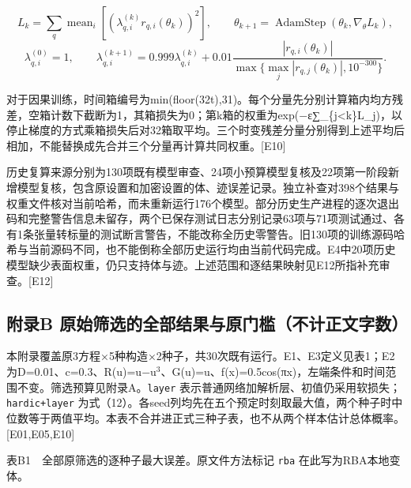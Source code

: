\documentclass[11pt,a4paper]{article}
\begin{document}
\[
L_k=\sum_q\operatorname{mean}_i[(\lambda_{q,i}^{(k)}r_{q,i}(\theta_k))^2],\qquad
\theta_{k+1}=\operatorname{AdamStep}(\theta_k,\nabla_\theta L_k),
\] \[
\lambda_{q,i}^{(0)}=1,\qquad
\lambda_{q,i}^{(k+1)}=0.999\lambda_{q,i}^{(k)}
+0.01\frac{|r_{q,i}(\theta_k)|}{\max\{\max_j|r_{q,j}(\theta_k)|,10^{-300}\}}.
\]

对于因果训练，时间箱编号为min(floor(32t),31)。每个分量先分别计算箱内均方残差，空箱计数下截断为1，其箱损失为0；第k箱的权重为exp(\ensuremath{-}ε∑\_\allowbreak{}\{j\textless k\}L\_\allowbreak{}j)，以停止梯度的方式乘箱损失后对32箱取平均。三个时变残差分量分别得到上述平均后相加，不能替换成先合并三个分量再计算共同权重。{[}E10{]}

历史复算来源分别为130项既有模型审查、24项小预算模型复核及22项第一阶段新增模型复核，包含原设置和加密设置的体、迹误差记录。独立补查对398个结果与权重文件核对当前哈希，而未重新运行176个模型。部分历史生产进程的逐次退出码和完整警告信息未留存，两个已保存测试日志分别记录63项与71项测试通过、各有1条张量转标量的测试断言警告，不能改称全历史零警告。旧130项的训练源码哈希与当前源码不同，也不能倒称全部历史运行均由当前代码完成。E4中20项历史模型缺少表面权重，仍只支持体与迹。上述范围和逐结果映射见E12所指补充审查。{[}E12{]}

\subsection{附录B 原始筛选的全部结果与原门槛（不计正文字数）}\label{ux9644ux5f55b-ux539fux59cbux7b5bux9009ux7684ux5168ux90e8ux7ed3ux679cux4e0eux539fux95e8ux69dbux4e0dux8ba1ux6b63ux6587ux5b57ux6570}

本附录覆盖原3方程×5种构造×2种子，共30次既有运行。E1、E3定义见表1；E2为D=0.01、c=0.3、R(u)=u\ensuremath{-}u\ensuremath{^{3}}、G(u)=u、f(x)=0.5cos(πx)，左端条件和时间范围不变。筛选预算见附录A。\texttt{layer} 表示普通网络加解析层、初值仍采用软损失；\texttt{hardic+\allowbreak{}layer} 为式（12）。各seed列均先在五个预定时刻取最大值，两个种子时中位数等于两值平均。本表不合并进正式三种子表，也不从两个样本估计总体概率。{[}E01,E05,E10{]}

表B1　全部原筛选的逐种子最大误差。原文件方法标记 \texttt{rba} 在此写为RBA本地变体。
\end{document}
